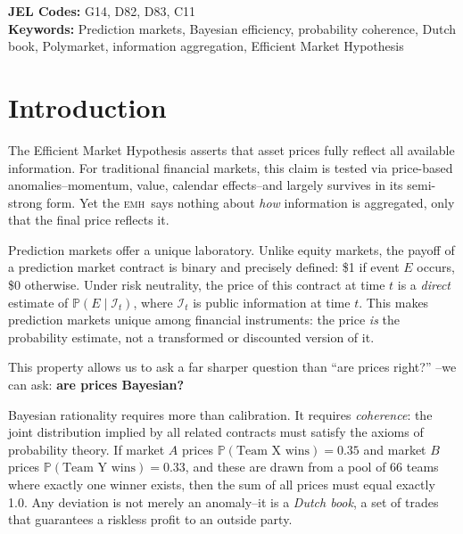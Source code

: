 \documentclass[12pt,a4paper]{article}
\theoremstyle{definition}
\theoremstyle{remark}
\newcommand{\Prob}{\mathbb{P}}
\newcommand{\EMH}{\textsc{emh}}
\begin{document}
\begin{titlepage}
\vspace{1cm}

{\small
\textbf{JEL Codes:} G14, D82, D83, C11\\[4pt]
\textbf{Keywords:} Prediction markets, Bayesian efficiency, probability coherence,
Dutch book, Polymarket, information aggregation, Efficient Market Hypothesis
}
\end{titlepage}

\newpage
\tableofcontents
\newpage

\section{Introduction}
\label{sec:intro}

The Efficient Market Hypothesis \citep{fama1970} asserts that asset prices fully
reflect all available information.
For traditional financial markets, this claim is tested via price-based
anomalies--momentum, value, calendar effects--and largely survives in
its semi-strong form.
Yet the \EMH\ says nothing about \emph{how} information is aggregated, only that
the final price reflects it.

Prediction markets offer a unique laboratory.
Unlike equity markets, the payoff of a prediction market contract is binary and
precisely defined: \$1 if event $E$ occurs, \$0 otherwise.
Under risk neutrality, the price of this contract at time $t$ is a \emph{direct}
estimate of $\Prob(E \mid \mathcal{I}_t)$, where $\mathcal{I}_t$ is public
information at time $t$.
This makes prediction markets unique among financial instruments: the price
\emph{is} the probability estimate, not a transformed or discounted version of it.

This property allows us to ask a far sharper question than ``are prices right?''
--we can ask: \textbf{are prices Bayesian?}

Bayesian rationality requires more than calibration.
It requires \emph{coherence}: the joint distribution implied by all related
contracts must satisfy the axioms of probability theory.
If market $A$ prices $\Prob(\text{Team X wins}) = 0.35$ and market $B$ prices
$\Prob(\text{Team Y wins}) = 0.33$, and these are drawn from a pool of 66 teams
where exactly one winner exists, then the sum of all prices must equal exactly
1.0.
Any deviation is not merely an anomaly--it is a \emph{Dutch book}, a set of
trades that guarantees a riskless profit to an outside party.
\end{document}
